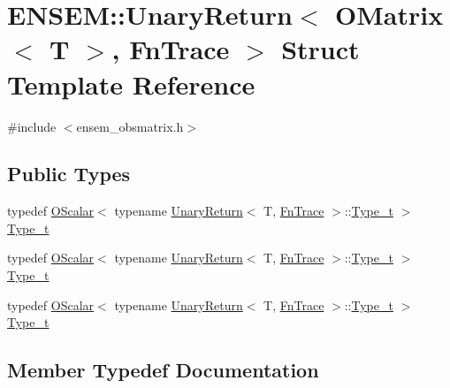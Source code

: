 \hypertarget{structENSEM_1_1UnaryReturn_3_01OMatrix_3_01T_01_4_00_01FnTrace_01_4}{}\section{E\+N\+S\+EM\+:\+:Unary\+Return$<$ O\+Matrix$<$ T $>$, Fn\+Trace $>$ Struct Template Reference}
\label{structENSEM_1_1UnaryReturn_3_01OMatrix_3_01T_01_4_00_01FnTrace_01_4}


{\ttfamily \#include $<$ensem\+\_\+obsmatrix.\+h$>$}

\subsection*{Public Types}
\begin{DoxyCompactItemize}
\item 
typedef \mbox{\hyperlink{classENSEM_1_1OScalar}{O\+Scalar}}$<$ typename \mbox{\hyperlink{structENSEM_1_1UnaryReturn}{Unary\+Return}}$<$ T, \mbox{\hyperlink{structENSEM_1_1FnTrace}{Fn\+Trace}} $>$\+::\mbox{\hyperlink{structENSEM_1_1UnaryReturn_3_01OMatrix_3_01T_01_4_00_01FnTrace_01_4_a3a513c4d3321678f089c292ce4a36fe9}{Type\+\_\+t}} $>$ \mbox{\hyperlink{structENSEM_1_1UnaryReturn_3_01OMatrix_3_01T_01_4_00_01FnTrace_01_4_a3a513c4d3321678f089c292ce4a36fe9}{Type\+\_\+t}}
\item 
typedef \mbox{\hyperlink{classENSEM_1_1OScalar}{O\+Scalar}}$<$ typename \mbox{\hyperlink{structENSEM_1_1UnaryReturn}{Unary\+Return}}$<$ T, \mbox{\hyperlink{structENSEM_1_1FnTrace}{Fn\+Trace}} $>$\+::\mbox{\hyperlink{structENSEM_1_1UnaryReturn_3_01OMatrix_3_01T_01_4_00_01FnTrace_01_4_a3a513c4d3321678f089c292ce4a36fe9}{Type\+\_\+t}} $>$ \mbox{\hyperlink{structENSEM_1_1UnaryReturn_3_01OMatrix_3_01T_01_4_00_01FnTrace_01_4_a3a513c4d3321678f089c292ce4a36fe9}{Type\+\_\+t}}
\item 
typedef \mbox{\hyperlink{classENSEM_1_1OScalar}{O\+Scalar}}$<$ typename \mbox{\hyperlink{structENSEM_1_1UnaryReturn}{Unary\+Return}}$<$ T, \mbox{\hyperlink{structENSEM_1_1FnTrace}{Fn\+Trace}} $>$\+::\mbox{\hyperlink{structENSEM_1_1UnaryReturn_3_01OMatrix_3_01T_01_4_00_01FnTrace_01_4_a3a513c4d3321678f089c292ce4a36fe9}{Type\+\_\+t}} $>$ \mbox{\hyperlink{structENSEM_1_1UnaryReturn_3_01OMatrix_3_01T_01_4_00_01FnTrace_01_4_a3a513c4d3321678f089c292ce4a36fe9}{Type\+\_\+t}}
\end{DoxyCompactItemize}


\subsection{Member Typedef Documentation}
\mbox{\label{structENSEM_1_1UnaryReturn_3_01OMatrix_3_01T_01_4_00_01FnTrace_01_4_a3a513c4d3321678f089c292ce4a36fe9}} 
